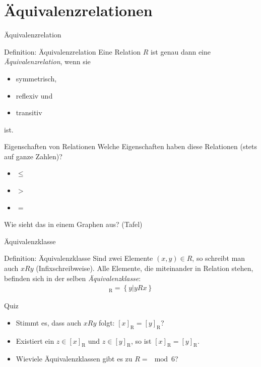 \section{Äquivalenzrelationen}
\begin{frame}{Äquivalenzrelation}
    \begin{block}{Definition: Äquivalenzrelation}
        Eine Relation $R$ ist genau dann eine \emph{Äquivalenzrelation}, wenn sie
        \begin{itemize}
            \item symmetrisch,
            \item reflexiv und
            \item transitiv
        \end{itemize} ist.
    \end{block}
\end{frame}
\begin{frame}{Eigenschaften von Relationen}
    Welche Eigenschaften haben diese Relationen (stets auf ganze Zahlen)?
    \begin{itemize}
        \item $\leq$ 
        \item $>$ 
        \item $=$ 
    \end{itemize}
    Wie sieht das in einem Graphen aus? (Tafel)
\end{frame}
\begin{frame}{Äquivalenzklasse}
    \begin{block}{Definition: Äquivalenzklasse}
        Sind zwei Elemente $\left( x,y \right)\in R$, so schreibt man auch $xRy$ (Infixschreibweise). Alle Elemente, die miteinander in Relation stehen, befinden sich in der selben \emph{Äquivalenzklasse}:
        \begin{align*}
            [x]_\mathrm{R} = \left\{ y | yRx \right\}
        \end{align*}
    \end{block}
\end{frame}
\begin{frame}{Quiz}
    \begin{itemize}
        \item Stimmt es, dass auch $xRy$ folgt: $[x]_\mathrm{R} = [y]_{\mathrm{R}}$? 
        \item Existiert ein $z\in \left[ x \right]_\mathrm{R}$ und $z\in\left[ y \right]_\mathrm{R}$, so ist $\left[ x \right]_\mathrm{R} = \left[ y \right]_\mathrm{R}$. 
        \item Wieviele Äquivalenzklassen gibt es zu $R = \mod 6$? 
    \end{itemize}
\end{frame}
